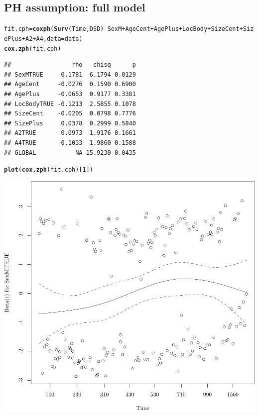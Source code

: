 \documentclass{article}\usepackage[]{graphicx}\usepackage[]{color}
\makeatletter
\def\maxwidth{ %
  \ifdim\Gin@nat@width>\linewidth
    \linewidth
  \else
    \Gin@nat@width
  \fi
}
\newcommand{\hlnum}[1]{\textcolor[rgb]{0.686,0.059,0.569}{#1}}%
\newcommand{\hlopt}[1]{\textcolor[rgb]{0,0,0}{#1}}%
\newcommand{\hlstd}[1]{\textcolor[rgb]{0.345,0.345,0.345}{#1}}%
\newcommand{\hlkwb}[1]{\textcolor[rgb]{0.69,0.353,0.396}{#1}}%
\newcommand{\hlkwc}[1]{\textcolor[rgb]{0.333,0.667,0.333}{#1}}%
\newcommand{\hlkwd}[1]{\textcolor[rgb]{0.737,0.353,0.396}{\textbf{#1}}}%
\newenvironment{kframe}{%
 \def\at@end@of@kframe{}%
 \ifinner\ifhmode%
  \def\at@end@of@kframe{\end{minipage}}%
  \begin{minipage}{\columnwidth}%
 \fi\fi%
 \def\FrameCommand##1{\hskip\@totalleftmargin \hskip-\fboxsep
 \colorbox{shadecolor}{##1}\hskip-\fboxsep
     \hskip-\linewidth \hskip-\@totalleftmargin \hskip\columnwidth}%
 \MakeFramed {\advance\hsize-\width
   \@totalleftmargin\z@ \linewidth\hsize
   \@setminipage}}%
 {\par\unskip\endMakeFramed%
 \at@end@of@kframe}
\newenvironment{knitrout}{}{} %
\makeatother
\begin{document}
\subsection{PH assumption: full model}
\begin{knitrout}
\color{fgcolor}\begin{kframe}
\begin{alltt}
\hlstd{fit.cph} \hlkwb{=} \hlkwd{coxph}\hlstd{(}\hlkwd{Surv}\hlstd{(Time, DSD)} \hlopt{~} \hlstd{SexM} \hlopt{+} \hlstd{AgeCent} \hlopt{+} \hlstd{AgePlus} \hlopt{+} \hlstd{LocBody} \hlopt{+} \hlstd{SizeCent} \hlopt{+} \hlstd{SizePlus} \hlopt{+} \hlstd{A2} \hlopt{+} \hlstd{A4,} \hlkwc{data} \hlstd{= data)}
\hlkwd{cox.zph}\hlstd{(fit.cph)}
\end{alltt}
\begin{verbatim}
##                 rho   chisq      p
## SexMTRUE     0.1781  6.1794 0.0129
## AgeCent     -0.0276  0.1590 0.6900
## AgePlus     -0.0653  0.9177 0.3381
## LocBodyTRUE -0.1213  2.5855 0.1078
## SizeCent    -0.0205  0.0798 0.7776
## SizePlus     0.0378  0.2999 0.5840
## A2TRUE       0.0973  1.9176 0.1661
## A4TRUE      -0.1033  1.9860 0.1588
## GLOBAL           NA 15.9230 0.0435
\end{verbatim}
\begin{alltt}
\hlkwd{plot}\hlstd{(}\hlkwd{cox.zph}\hlstd{(fit.cph)[}\hlnum{1}\hlstd{])}
\end{alltt}
\end{kframe}

{\centering \includegraphics[width=\maxwidth]{figure/05-eda-ph-check-full-2-1} 

}



\end{knitrout}
\end{document}

